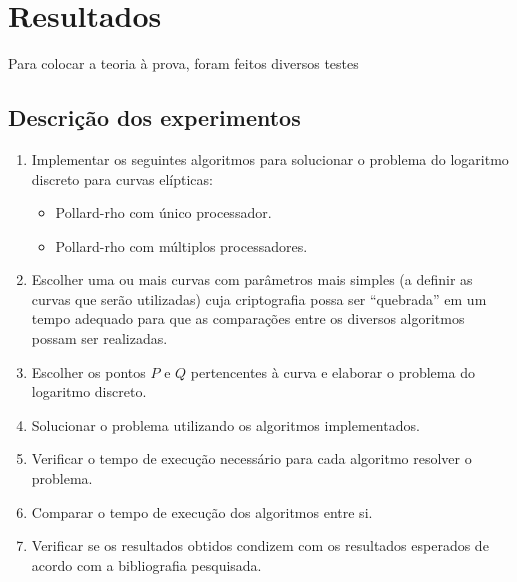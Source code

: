 \chapter{Resultados}
Para colocar a teoria à prova, foram feitos diversos testes

\section{Descrição dos experimentos}
\begin{enumerate}

\item Implementar os seguintes algoritmos para solucionar o problema do logaritmo discreto para curvas elípticas:
  \begin{itemize}
  \item Pollard-rho com único processador.
  \item Pollard-rho com múltiplos processadores.
  \end{itemize}
\item Escolher uma ou mais curvas com parâmetros mais simples (a definir as curvas que serão utilizadas) cuja criptografia possa ser ``quebrada'' em um tempo adequado para que as comparações entre os diversos algoritmos possam ser realizadas.
\item Escolher os pontos \(P\) e \(Q\) pertencentes à curva e elaborar o problema do logaritmo discreto.
\item Solucionar o problema utilizando os algoritmos implementados.
\item Verificar o tempo de execução necessário para cada algoritmo resolver o problema.
\item Comparar o tempo de execução dos algoritmos entre si.
\item Verificar se os resultados obtidos condizem com os resultados esperados de acordo com a bibliografia pesquisada.

\end{enumerate}
